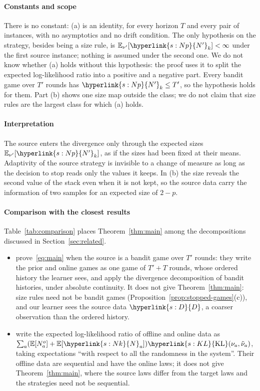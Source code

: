 \documentclass[11pt]{article}
\newcommand{\sy}[2]{\hyperlink{#1}{#2}}
\newcommand{\E}{\mathbb{E}}
\newcommand{\KL}{\sy{s:KL}{\mathrm{KL}}}
\newcommand{\Np}{\sy{s:Np}{N'}}
\newcommand{\Dd}{\sy{s:D}{D}}
\newcommand{\Nc}{\sy{s:Nk}{N}}
\begin{document}
\paragraph{Constants and scope} There is no constant: (a) is an identity, for every horizon $T$ and
every pair of instances, with no asymptotics and no drift condition. The only hypothesis on the
strategy, besides being a size rule, is $\E_{\nu'}[\Np_k]<\infty$ under the first source instance;
nothing is assumed under the second one. We do not know whether (a) holds without this hypothesis:
the proof uses it to split the expected log-likelihood ratio into a positive and a negative part.
Every bandit game over $T'$ rounds has $\Np_k\le T'$, so the hypothesis holds for them. Part (b)
shows one size map outside the class; we do not claim that size rules are the largest class for
which (a) holds.

\paragraph{Interpretation} The source enters the divergence only through the expected sizes
$\E_{\nu'}[\Np_k]$, as if the sizes had been fixed at their means. Adaptivity of the source strategy
is invisible to a change of measure as long as the decision to stop reads only the values it keeps.
In (b) the size reveals the second value of the stack even when it is not kept, so the source data
carry the information of two samples for an expected size of $2-p$.

\paragraph{Comparison with the closest results} Table~\ref{tab:comparison} places
Theorem~\ref{thm:main} among the decompositions discussed in Section~\ref{sec:related}.
\begin{itemize}
\item \citet[Appendix~E, Lemma~22]{PMRM26} prove~\eqref{eq:main} when the source is a bandit game
  over $T'$ rounds: they write the prior and online games as one game of $T'+T$ rounds, whose
  ordered history the learner sees, and apply the divergence decomposition of bandit histories,
  under absolute continuity. It does not give Theorem~\ref{thm:main}: size rules need not be bandit
  games (Proposition~\ref{prop:stopped-games}(c)), and our learner sees the source data $\Dd$, a
  coarser observation than the ordered history.
\item \citet[Appendix~B.1, (10)]{AJSS23} write the expected log-likelihood ratio of offline and
  online data as $\sum_a(\E[N^{o}_a]+\E[\Nc_a])\KL(\nu_a,\tilde\nu_a)$, taking expectations ``with
  respect to all the randomness in the system''. Their offline data are sequential and have the
  online laws; it does not give Theorem~\ref{thm:main}, where the source laws differ from the target
  laws and the strategies need not be sequential.
\end{itemize}
\end{document}
